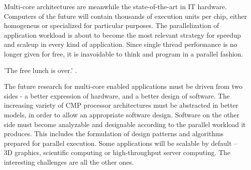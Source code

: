\documentclass[a4paper]{article}
\begin{document}
Multi-core architectures are meanwhile the state-of-the-art in IT hardware. Computers of the future will contain thousands of execution units per chip, either homogeneus or specialized for particular purposes. The parallelization of application workload is about to become the most relevant strategy for speedup and scaleup in every kind of application. Since single thread performance is no longer given for free, it is inavoidable to think and program in a parallel fashion. 

'The free lunch is over.' \cite{freelunch}.

The future research for multi-core enabled applications must be driven from two sides  - a better expression of hardware, and a better design of software. The increasing variety of CMP processor architectures must be abstracted in better models, in order to allow an appropriate software design. Software on the other side must become analyzable and designable according to the parallel workload it produces. This includes the formulation of design patterns \cite{parpatterns} and algorithms prepared for parallel execution. Some applications will be scalable by default -- 3D graphics, scientific computing or high-throughput server computing. The interesting challenges are all the other ones. 



\end{document}
